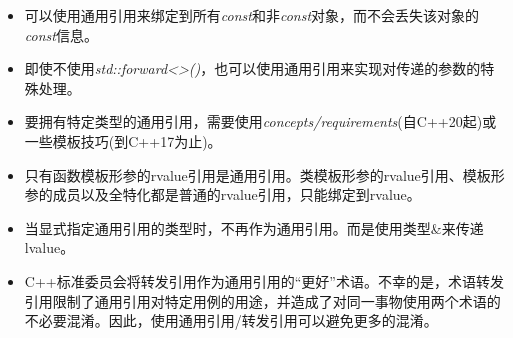 \begin{itemize}
	\item 可以使用通用引用来绑定到所有\textit{const}和非\textit{const}对象，而不会丢失该对象的\textit{const}信息。
	\item 即使不使用\textit{std::forward<>()}，也可以使用通用引用来实现对传递的参数的特殊处理。
	\item 要拥有特定类型的通用引用，需要使用\textit{concepts/requirements}(自C++20起)或一些模板技巧(到C++17为止)。
	\item 只有函数模板形参的rvalue引用是通用引用。类模板形参的rvalue引用、模板形参的成员以及全特化都是普通的rvalue引用，只能绑定到rvalue。
	\item 当显式指定通用引用的类型时，不再作为通用引用。而是使用类型\&来传递lvalue。
	\item C++标准委员会将转发引用作为通用引用的“更好”术语。不幸的是，术语转发引用限制了通用引用对特定用例的用途，并造成了对同一事物使用两个术语的不必要混淆。因此，使用通用引用/转发引用可以避免更多的混淆。
\end{itemize}


